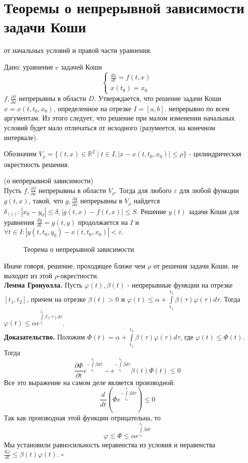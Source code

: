 \section{Теоремы о непрерывной зависимости задачи Коши}
от начальных условий и правой части уравнения.

Дано: уравнение c задачей Коши
$$\begin{cases}
    \frac{dx}{dt}=f(t,x)\\
    x(t_0)=x_0
\end{cases}$$ 
$f,\frac{\partial f}{\partial x}$  непрерывны в области $D$. 
Утверждается, что решение задачи Коши $x=x(t,t_0,x_0)$, определенное на 
отрезке $I=[a,b]$. 
непрерывно по всем 
аргументам. Из этого следует, что решение при малом изменении начальных 
условий будет мало отличаться от исходного (разумеется, на конечном
интервале). 

Обозначим $V_\rho=\{(t,x)\in \mathbb{R}^2\mid t\in I,|x-x(t,t_0,x_0)|
\leqslant \rho\}$ - цилиндрическая окрестность решения. 

\begin{theor}
    (о непрерывной зависимости)\\
    Пусть $f,\frac{\partial f}{\partial x}$  непрерывны в области $V_\rho$.
    Тогда для любого $\varepsilon$ для любой функции $g(t,x)$, такой, что
$g,\frac{\partial g}{\partial x}$ непрерывны в $V_\rho$ найдется
 $\delta_(\varepsilon):|x_0-y_0|\leqslant \delta,|g(t,x)-f(t,x)|\leqslant S$.
 Решение $y(t)$ задачи Коши для уравнения $\frac{dy}{dt}=g(t,y)$ продолжается
 на $I$ и  $\forall t\in I: |y(t,t_0,y_0)-x(t,t_0,x_0)|<\varepsilon$.
\end{theor}
\begin{figure}[H]
    \centering
    
    \caption{Теорема о непрерывной зависимости}
    \label{fig:}
\end{figure}
Иначе говоря, решение, проходящее ближе чем $\rho$ от решения задачи Коши,
не выходит из этой $\rho$-окрестности.\\
\textbf{Лемма Гронуолла.} Пусть $\varphi(t),\beta(t)$ - непрерывные функции
на отрезке $[t_1,t_2]$, причем на отрезке $\beta(t)>0$ и  $\varphi(t)\leqslant 
\alpha+\int\limits_{t_1}^{t_2} \beta(\tau)\varphi(\tau)d\tau$. 
Тогда 
$\varphi(t)\leqslant \alpha e^{\int\limits_{t_1}^{t_2}\beta(\tau)d\tau}$.\\
\textbf{Доказательство.} Положим $\Phi(t)=\alpha+
\int\limits_{t_1}^{t_2} \beta(\tau)\varphi(\tau)d\tau$, где 
$\varphi(t)\leqslant \Phi(t)$. Тогда
$$\frac{\partial \Phi}{\partial t}e^{-\int\limits_{t_1}^{t_2}\beta d\tau}
-e^{-\int\limits_{t_1}^{t_2}\beta d\tau}\beta(t)\Phi(t)\leqslant 0$$ 
Все это выражение на самом деле является производной:
$$\frac{d}{dt}\left( \Phi e^{-\int\limits_{t_1}^{t}\beta d\tau} \right)
\leqslant 0$$ 
 Так как производная этой функции отрицательна, то 
$$\varphi \leqslant \Phi\leqslant \alpha
e^{\int\limits_{t_1}^{t_2}\beta d\tau}$$
Мы установили равносильность неравенства из условия и неравенства
$\frac{d\varphi}{dt}\leqslant \beta(t)\varphi(t)$. $\square$ 

